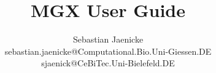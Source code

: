 \documentclass{scrbook}
\title{MGX User Guide}
\author{Sebastian Jaenicke\\sebastian.jaenicke@Computational.Bio.Uni-Giessen.DE\\sjaenick@CeBiTec.Uni-Bielefeld.DE}
\begin{document}
\frontmatter
\maketitle
\cleardoublepage

\newpage
\thispagestyle{empty}

\tableofcontents

\mainmatter




%



%
%


\listoffigures
\listoftables

\begin{appendix}

\end{appendix}
\end{document}
